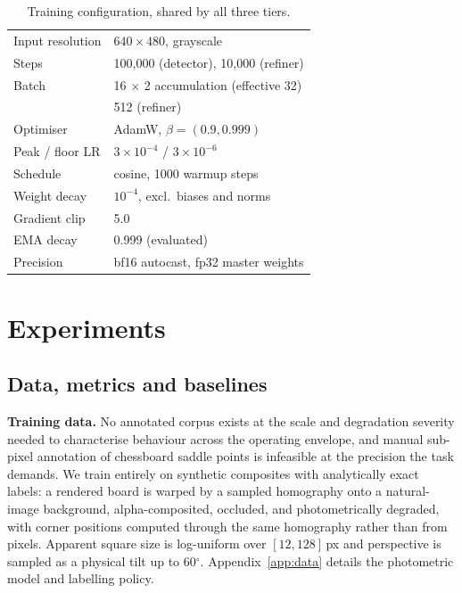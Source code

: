 \documentclass[10pt,twocolumn,letterpaper]{article}
\newcommand{\dgr}{$^\circ$}
\begin{document}
\begin{table}[t]
\centering\small
\begin{tabular}{ll}
\toprule
Input resolution & $640\times480$, grayscale \\
Steps & 100,000 (detector), 10,000 (refiner) \\
Batch & 16 $\times$ 2 accumulation (effective 32) \\
 & 512 (refiner) \\
Optimiser & AdamW, $\beta = (0.9, 0.999)$ \\
Peak / floor LR & $3\times10^{-4}$ / $3\times10^{-6}$ \\
Schedule & cosine, 1000 warmup steps \\
Weight decay & $10^{-4}$, excl.\ biases and norms \\
Gradient clip & 5.0 \\
EMA decay & 0.999 (evaluated) \\
Precision & bf16 autocast, fp32 master weights \\
\bottomrule
\end{tabular}
\caption{Training configuration, shared by all three tiers.}
\label{tab:hyper}
\end{table}

\section{Experiments}

\subsection{Data, metrics and baselines}
\label{sec:setup}

\textbf{Training data.} No annotated corpus exists at the scale and degradation severity needed to
characterise behaviour across the operating envelope, and manual sub-pixel annotation of chessboard
saddle points is infeasible at the precision the task demands. We train entirely on synthetic
composites with analytically exact labels: a rendered board is warped by a sampled homography onto
a natural-image background, alpha-composited, occluded, and photometrically degraded, with corner
positions computed through the same homography rather than from pixels. Apparent square size is
log-uniform over $[12,128]$\,px and perspective is sampled as a physical tilt up to 60\dgr.
Appendix~\ref{app:data} details the photometric model and labelling policy.
\end{document}
